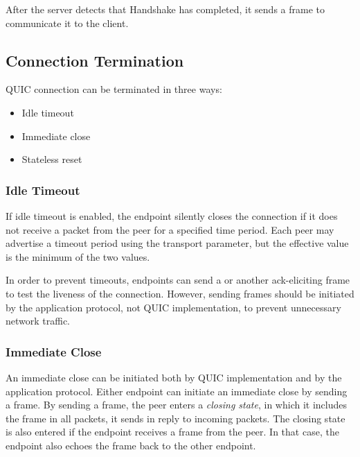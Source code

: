 After the server detects that Handshake has completed, it sends a \HANDSHAKEDONE{} frame to
communicate it to the client.

\subsection{Connection Termination}

QUIC connection can be terminated in three ways:

\begin{itemize}

  \item Idle timeout

  \item Immediate close

  \item Stateless reset

\end{itemize}

\subsubsection{Idle Timeout}\label{sec:02-idle-timeout}

If idle timeout is enabled, the endpoint silently closes the connection if it does not receive a
packet from the peer for a specified time period. Each peer may advertise a timeout period using the
\MaxIdleTimeout{} transport parameter, but the effective value is the minimum of the two values.

In order to prevent timeouts, endpoints can send a \PING{} or another ack-eliciting frame to test
the liveness of the connection. However, sending \PING{} frames should be initiated by the
application protocol, not QUIC implementation, to prevent unnecessary network traffic.

\subsubsection{Immediate Close}

An immediate close can be initiated both by QUIC implementation and by the application protocol.
Either endpoint can initiate an immediate close by sending a \CONNECTIONCLOSE{} frame. By sending a
\CONNECTIONCLOSE{} frame, the peer enters a \textit{closing state}, in which it includes the
\CONNECTIONCLOSE{} frame in all packets, it sends in reply to incoming packets. The closing state is
also entered if the endpoint receives a \CONNECTIONCLOSE{} frame from the peer. In that case, the
endpoint also echoes the \CONNECTIONCLOSE{} frame back to the other endpoint.

